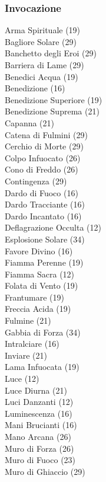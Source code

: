 \begin{multicols}{3}
	\subsubsection{Invocazione}	
	Arma Spirituale (19)\\
	Bagliore Solare (29)\\
	Banchetto degli Eroi (29)\\
	Barriera di Lame (29)\\
	Benedici Acqua (19)\\
	Benedizione (16)\\
	Benedizione Superiore (19)\\
	Benedizione Suprema (21)\\
	Capanna (21)\\
	Catena di Fulmini (29)\\
	Cerchio di Morte (29)\\
	Colpo Infuocato (26)\\
	Cono di Freddo (26)\\
	Contingenza (29)\\
	Dardo di Fuoco (16)\\
	Dardo Tracciante (16)\\
	Dardo Incantato (16)\\
	Deflagrazione Occulta (12)\\
	Esplosione Solare (34)\\
	Favore Divino (16)\\
	Fiamma Perenne (19)\\
	Fiamma Sacra (12)\\
	Folata di Vento (19)\\
	Frantumare (19)\\
	Freccia Acida (19)\\
	Fulmine (21)\\
	Gabbia di Forza (34)\\
	Intralciare (16)\\
	Inviare (21)\\
	Lama Infuocata (19)\\
	Luce (12)\\
	Luce Diurna (21)\\
	Luci Danzanti (12)\\
	Luminescenza (16)\\
	Mani Brucianti (16)\\
	Mano Arcana (26)\\
	Muro di Forza (26)\\
	Muro di Fuoco (23)\\
	Muro di Ghiaccio (29)\\

\end{multicols}
